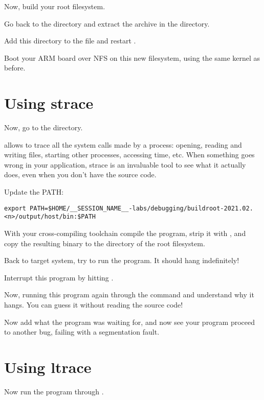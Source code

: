 Now, build your root filesystem.

Go back to the  directory
and extract the 
archive in the  directory.

Add this directory to the  file and restart
.

Boot your ARM board over NFS on this new filesystem, using the same
kernel as before.

\section{Using strace}

Now, go to the  directory.

 allows to trace all the system calls made by a process:
opening, reading and writing files, starting other processes,
accessing time, etc. When something goes wrong in your application,
strace is an invaluable tool to see what it actually does, even when
you don't have the source code.


Update the PATH:
\footnotesize
\begin{verbatim}
export PATH=$HOME/__SESSION_NAME__-labs/debugging/buildroot-2021.02.<n>/output/host/bin:$PATH
\end{verbatim}
\normalsize

With your cross-compiling toolchain
compile the  program, strip it with
, and copy the resulting binary to the
 directory of the root filesystem.

Back to target system, try to run the 
program. It should hang indefinitely!

Interrupt this program by hitting \code{[Ctrl] [C]}.

Now, running this program again through the  command and
understand why it hangs. You can guess it without reading the source
code!

Now add what the program was waiting for, and now see your program
proceed to another bug, failing with a segmentation fault.

\section{Using ltrace}

Now run the program through .

